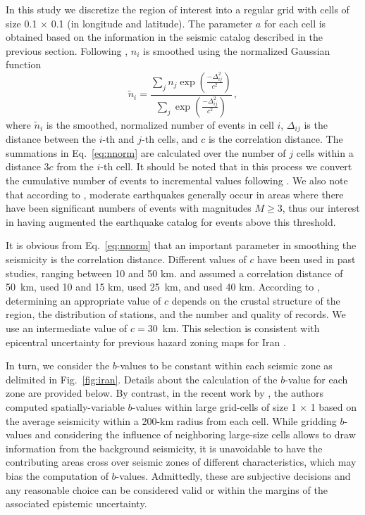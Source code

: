 In this study we discretize the region of interest into a regular grid with cells of size 0.1\textdegree{} $\times$ 0.1\textdegree{} (in longitude and latitude). The parameter $a$ for each cell is obtained based on the information in the seismic catalog described in the previous section. Following \citet{Frankel1995}, $n_i$ is smoothed using the normalized Gaussian function
% 
\begin{equation}
	\tilde{n}_i = \frac
		{ \sum_{j} n_{j} \exp ( \frac{ -\Delta_{ij}^{2} }{ c^2 } ) }
		{ \sum_{j} \exp ( \frac{ -\Delta_{ij}^{2} }{ c^2 } ) }
	\, ,
	\label{eq:nnorm}
\end{equation}
% 
where $\tilde{n}_i$ is the smoothed, normalized number of events in cell $i$, $\Delta_{ij}$ is the distance between the $i$-th and $j$-th cells, and $c$ is the correlation distance. The summations in Eq.~\ref{eq:nnorm} are calculated over the number of $j$ cells within a distance $3c$ from the $i$-th cell. It should be noted that in this process we convert the cumulative number of events to incremental values following \citet{Herrmann1977}. We also note that according to \citet{Frankel1995}, moderate earthquakes generally occur in areas where there have been significant numbers of events with magnitudes $M \geq 3$, thus our interest in having augmented the earthquake catalog for events above this threshold.

It is obvious from Eq.~\ref{eq:nnorm} that an important parameter in smoothing the seismicity is the correlation distance. Different values of $c$ have been used in past studies, ranging between 10 and 50 km. \citet{Frankel1995} and \citet{Boyd2008} assumed a correlation distance of 50~km, \citet{Foteva2006} used 10 and 15 km, \citet{Barani2007} used 25~km, and \citet{Khodaverdian_2016_BSSA} used 40 km. According to \citet{Mirzaei1997}, determining an appropriate value of $c$ depends on the crustal structure of the region, the distribution of stations, and the number and quality of records. We use an intermediate value of $c=30$~km. This selection is consistent with epicentral uncertainty for previous hazard zoning maps for Iran \citep[see][]{Zare2012}.

In turn, we consider the $b$-values to be constant within each seismic zone as delimited in Fig.~\ref{fig:iran}. Details about the calculation of the $b$-value for each zone are provided below. By contrast, in the recent work by \citet{Khodaverdian_2016_BSSA}, the authors computed spatially-variable $b$-values within large grid-cells of size 1\textdegree{} $\times$ 1\textdegree{} based on the average seismicity within a 200-km radius from each cell. While gridding $b$-values and considering the influence of neighboring large-size cells allows to draw information from the background seismicity, it is unavoidable to have the contributing areas cross over seismic zones of different characteristics, which may bias the computation of $b$-values. Admittedly, these are subjective decisions and any reasonable choice can be considered valid or within the margins of the associated epistemic uncertainty.

